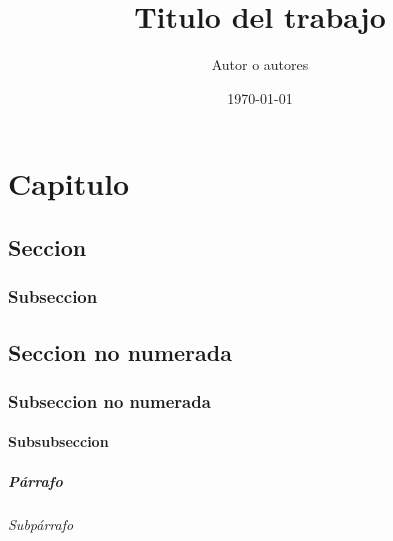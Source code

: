 \documentclass[
    a4paper,
    12pt
]{book}
\title{Titulo del trabajo}
\date{\today}
\author{Autor o autores}
\begin{document}
	\maketitle

    \tableofcontents
    
    \chapter{Capitulo}
    
    \section{Seccion}
	\lipsum[1-1]

    \subsection{Subseccion}
    \lipsum[1-1]
    
    \section*{Seccion no numerada}
    \lipsum[1-1]

    \subsection*{Subseccion no numerada}
    \lipsum[1-1]

    \subsubsection{Subsubseccion}
    \lipsum[1-1]
 
    \paragraph{Párrafo}
    \lipsum[1-1]
    
    \subparagraph{Subpárrafo}
    \lipsum[1-1]
       
\end{document}
